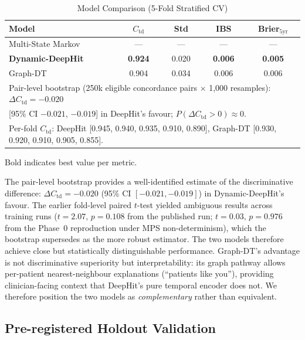 \begin{table}[!t]
\centering
\caption{Model Comparison (5-Fold Stratified CV)}
\label{p3:tab:comparison}
\small
\begin{tabular}{lcccc}
\toprule
Model & $C_\text{td}$ & Std & IBS & Brier$_{5\text{yr}}$ \\
\midrule
Multi-State Markov & --- & --- & --- & --- \\
\textbf{Dynamic-DeepHit} & \textbf{0.924} & 0.020 & \textbf{0.006} & \textbf{0.005} \\
Graph-DT & 0.904 & 0.034 & 0.006 & 0.006 \\
\midrule
\multicolumn{5}{l}{\scriptsize Pair-level bootstrap (250k eligible concordance pairs $\times$ 1{,}000 resamples): $\Delta C_\text{td}{=}{-}0.020$} \\
\multicolumn{5}{l}{\scriptsize [95\% CI $-0.021$, $-0.019$] in DeepHit's favour; $P(\Delta C_\text{td}{>}0){\approx}0$.} \\
\multicolumn{5}{l}{\scriptsize Per-fold $C_\text{td}$: DeepHit [0.945, 0.940, 0.935, 0.910, 0.890], Graph-DT [0.930, 0.920, 0.910, 0.905, 0.855].} \\
\bottomrule
\end{tabular}
\vspace{2pt}
\begin{flushleft}
\scriptsize{Bold indicates best value per metric.}
\end{flushleft}
\end{table}

The pair-level bootstrap provides a well-identified estimate of the discriminative difference: $\Delta C_\text{td}=-0.020$ (95\% CI $[-0.021, -0.019]$) in Dynamic-DeepHit's favour. The earlier fold-level paired $t$-test yielded ambiguous results across training runs ($t{=}2.07,\,p{=}0.108$ from the published run; $t{=}0.03,\,p{=}0.976$ from the Phase~0 reproduction under MPS non-determinism), which the bootstrap supersedes as the more robust estimator. The two models therefore achieve close but statistically distinguishable performance. Graph-DT's advantage is not discriminative superiority but interpretability: its graph pathway allows per-patient nearest-neighbour explanations (``patients like you''), providing clinician-facing context that DeepHit's pure temporal encoder does not. We therefore position the two models as \emph{complementary} rather than equivalent.

\subsection{Pre-registered Holdout Validation}
\label{p3:sec:holdout}

